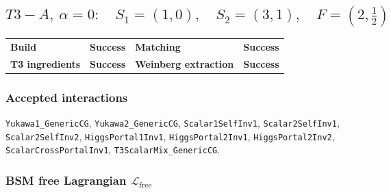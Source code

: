 \documentclass[10pt]{article}
\begin{document}
\subsection*{$T3-A,\ \alpha=0:\quad S_1=(1,0),\quad S_2=(3,1),\quad F=(2,\frac{1}{2})$}
\begin{center}
\begin{tabular}{>{\bfseries}l l >{\bfseries}l l}
\toprule
Build & \textbf{Success} & Matching & \textbf{Success} \\
T3 ingredients & \textbf{Success} & Weinberg extraction & \textbf{Success} \\
\bottomrule
\end{tabular}
\end{center}
\subsubsection*{Accepted interactions}
\texttt{Yukawa1\_GenericCG}, \texttt{Yukawa2\_GenericCG}, \texttt{Scalar1SelfInv1}, \texttt{Scalar2SelfInv1}, \texttt{Scalar2SelfInv2}, \texttt{HiggsPortal1Inv1}, \texttt{HiggsPortal2Inv1}, \texttt{HiggsPortal2Inv2}, \texttt{ScalarCrossPortalInv1}, \texttt{T3ScalarMix\_GenericCG}.
\subsubsection*{BSM free Lagrangian $\mathcal{L}_{\mathrm{free}}$}
\noindent{}\par
\smallskip
\noindent{}\par
\smallskip
\noindent{}\par
\smallskip
\noindent{}\par
\smallskip
\noindent{}\par
\smallskip
\noindent{}\par
\smallskip
\end{document}
